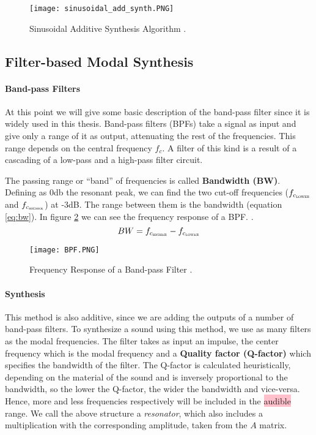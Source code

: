 \begin{figure}[H]
  \centering
    \texttt{[image: sinusoidal\_add\_synth.PNG]}
      \caption{Sinusoidal Additive Synthesis Algorithm \cite{Cook:2002:RSS:515316}.}
      \label{fig:sin_add_synth}
\end{figure}

\subsection{Filter-based Modal Synthesis}\label{sec:add_synth}

\paragraph{Band-pass Filters\\}\label{par:bpf}

At this point we will give some basic description of the band-pass filter since it is widely used in this thesis. Band-pass filters (BPFs) take a signal as input and give only a range of it as output, attenuating the rest of the frequencies. This range depends on the central frequency $f_c$. A filter of this kind is a result of a cascading of a low-pass and a high-pass filter circuit.

The passing range or ``band'' of frequencies is called \textbf{Bandwidth (BW)}. Defining as 0db the resonant peak, we can find the two cut-off frequencies ($f_{c{_\textsc{lower}}}$ and $f_{c_{\textsc{higher}}}$) at -3dB. The range between them is the bandwidth (equation \ref{eq:bw}). In figure \ref{fig:resp_bpf} we can see the frequency response of a BPF. \cite{bib:bpf}. 
\begin{equation}\label{eq:bw}
BW = f_{c_{\textsc{higher}}}-f_{c_{\textsc{lower}}}
\end{equation}   

\begin{figure}[H]
  \centering
    \texttt{[image: BPF.PNG]}
      \caption{Frequency Response of a Band-pass Filter  \cite{bib:bpf}.}
      \label{fig:resp_bpf}
\end{figure}

\paragraph{Synthesis\\}\label{par:synth}

This method is also additive, since we are adding the outputs of a number of band-pass filters. To synthesize a sound using this method, we use as many filters as the modal frequencies. The filter takes as input an impulse, the center frequency which is the modal frequency and a \textbf{Quality factor (Q-factor)} which specifies the bandwidth of the filter. The Q-factor is calculated heuristically, depending on the material of the sound and is inversely proportional to the bandwidth, so the lower the Q-factor, the wider the bandwidth and vice-versa. Hence, more and less frequencies respectively will be included in the \colorbox{pink}{audible} range. We call the above structure a \textit{resonator}, which also includes a multiplication with the corresponding amplitude, taken from the $A$ matrix.

